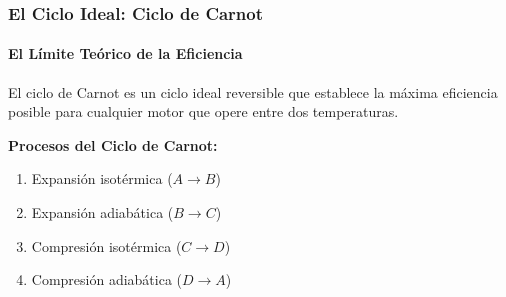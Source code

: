 \documentclass{beamer}
\begin{document}
\begin{frame}
    \frametitle{El Ciclo Ideal: Ciclo de Carnot}
    \framesubtitle{El Límite Teórico de la Eficiencia}
    
    El ciclo de Carnot es un ciclo ideal reversible que establece la máxima eficiencia posible para cualquier motor que opere entre dos temperaturas.
    
    \textbf{Procesos del Ciclo de Carnot:}
    \begin{enumerate}
        \item Expansión isotérmica ($A \rightarrow B$)
        \item Expansión adiabática ($B \rightarrow C$)
        \item Compresión isotérmica ($C \rightarrow D$)
        \item Compresión adiabática ($D \rightarrow A$)
    \end{enumerate}
    

\end{frame}
\end{document}
